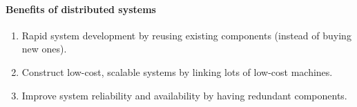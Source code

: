\paragraph{Benefits of distributed systems}
\begin{enumerate}
    \item Rapid system development by
        reusing existing components 
        (instead of buying new ones).

    \item Construct low-cost, 
        scalable systems by linking lots of low-cost machines.

    \item Improve system reliability 
        and availability by having redundant components.
\end{enumerate}
